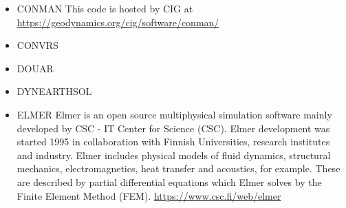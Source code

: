 \begin{itemize}


\item CONMAN 
This code is hosted by CIG at \url{https://geodynamics.org/cig/software/conman/}

\cite{kirh90}\cite{kiri00}
\cite{itki94}
\cite{kian95}
\cite{kian98}
\cite{itki98}
\cite{befo99}\cite{lemo99}
\cite{lemo00}
\cite{kogk05}
\cite{nake07}
\cite{dadh07}
\cite{kifr15}

\item CONVRS 

\cite{yoth12}
\cite{yosh13} 
 
\item DOUAR 

\cite{brtf08}
\cite{thfb08}
\cite{yahb09}
\cite{brya10}
\cite{lobh10}
\cite{mutg13}
\cite{whbb14}
\cite{neew18}
\cite{koen19}

\item DYNEARTHSOL 

\cite{chtl13}
\cite{lolc17}

\item ELMER 
Elmer is an open source multiphysical simulation software mainly developed by 
CSC - IT Center for Science (CSC). Elmer development was started 1995 in collaboration with 
Finnish Universities, research institutes and industry. Elmer includes physical models of 
fluid dynamics, structural mechanics, electromagnetics, heat transfer and acoustics, 
for example. These are described by partial differential equations which Elmer solves 
by the Finite Element Method (FEM). \url{https://www.csc.fi/web/elmer}

\cite{mals14}



\end{itemize}
